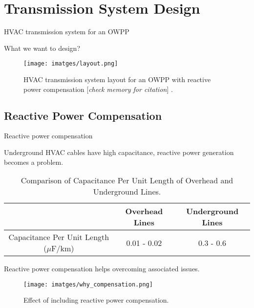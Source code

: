 \section{Transmission System Design}


\begin{frame}{}
    \tableofcontents[currentsection]
\end{frame}

\begin{frame}{HVAC transmission system for an OWPP}

What we want to design?
\begin{figure}[H] %
  \centering
  \texttt{[image: imatges/layout.png]}
  \caption{HVAC transmission system layout for an OWPP with reactive power compensation [\textit{check memory for citation}] .}
  \label{fig:fulltransmission} %
\end{figure}

\end{frame}
\subsection{Reactive Power Compensation}

\begin{frame}{Reactive power compensation}
  
Underground HVAC cables have high capacitance, reactive power generation becomes a problem.
\begin{table}[h]
  \centering
  \begin{tabular}{c|c|c}
  \hline
   & Overhead Lines & Underground Lines \\
   \hline
  Capacitance Per Unit Length ($\mu$F/km) & 0.01 - 0.02  & 0.3 - 0.6 \\
  \hline
  \end{tabular}
  \caption{Comparison of Capacitance Per Unit Length of Overhead and Underground Lines.}
  \label{tab:capacitance_comparison}
  \end{table}

Reactive power compensation helps overcoming associated issues.

\begin{figure}
  \centering
  \texttt{[image: imatges/why\_compensation.png]}
  \caption{Effect of including reactive power compensation.}
\end{figure}

\end{frame}

